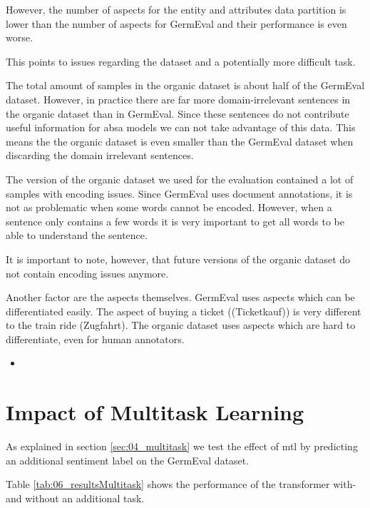However, the number of aspects for the entity and attributes data partition is lower than the number of aspects for GermEval and their performance is even worse.

This points to issues regarding the dataset and a potentially more difficult task. 
\medskip

The total amount of samples in the organic dataset is about half of the GermEval dataset. However, in practice there are far more domain-irrelevant sentences in the organic dataset than in GermEval. Since these sentences do not contribute useful information for \gls{absa} models we can not take advantage of this data. This means the the organic dataset is even smaller than the GermEval dataset when discarding the domain irrelevant sentences.
\medskip

The version of the organic dataset we used for the evaluation contained a lot of samples with encoding issues. Since GermEval uses document annotations, it is not as problematic when some words cannot be encoded. However, when a sentence only contains a few words it is very important to get all words to be able to understand the sentence. 

It is important to note, however, that future versions of the organic dataset do not contain encoding issues anymore.
\medskip

Another factor are the aspects themselves. GermEval uses aspects which can be differentiated easily. The aspect of buying a ticket {((Ticketkauf))} is very different to the train ride {(Zugfahrt)}. The organic dataset uses aspects which are hard to differentiate, even for human annotators. 


\begin{itemize}
	\item 
\end{itemize}

\section{Impact of Multitask Learning}
\label{sec:06_ResultsMultitask}

As explained in section \ref{sec:04_multitask} we test the effect of \acrfull{mtl} by predicting an additional sentiment label on the GermEval dataset.

Table \ref{tab:06_resultsMultitask} shows the performance of the transformer with- and without an additional task.  

